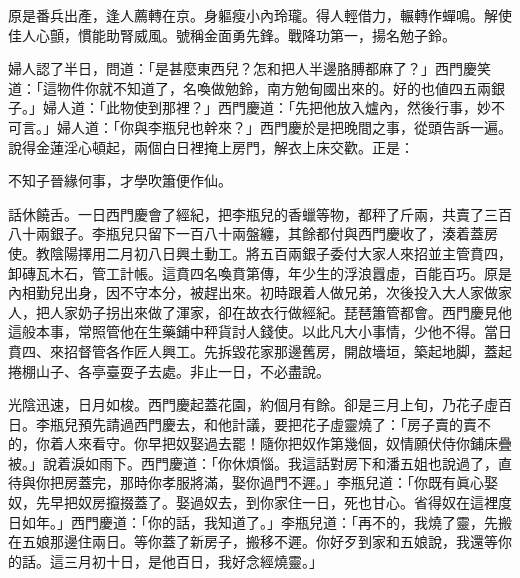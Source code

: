 \begin{myquote}
原是番兵出產，逢人薦轉在京。身軀瘦小內玲瓏。得人輕借力，輾轉作蟬鳴。解使佳人心顫，慣能助腎威風。號稱金面勇先鋒。戰降功第一，揚名勉子鈴。
\end{myquote}

婦人認了半日，問道：「是甚麼東西兒？怎和把人半邊胳膊都麻了？」{}西門慶笑道：「這物件你就不知道了，名喚做勉鈴，南方勉甸國出來的。好的也値四五兩銀子。」婦人道：「此物使到那裡？」西門慶道：「先把他放入爐內，然後行事，妙不可言。」婦人道：「你與李瓶兒也幹來？」{}西門慶於是把晚間之事，從頭告訴一遍。說得金蓮淫心頓起，兩個白日裡掩上房門，解衣上床交歡。正是：

\begin{myquote}
不知子晉緣何事，才學吹簫便作仙。
\end{myquote}

話休饒舌。一日西門慶會了經紀，把李瓶兒的香蠟等物，都秤了斤兩，共賣了三百八十兩銀子。李瓶兒只留下一百八十兩盤纏，其餘都付與西門慶收了，湊着蓋房使。教陰陽擇用二月初八日興土動工。將五百兩銀子委付大家人來招並主管賁四，卸磚瓦木石，管工計帳。這賁四名喚賁第傳，年少生的浮浪囂虛，百能百巧。原是內相勤兒出身，因不守本分，被趕出來。初時跟着人做兄弟，次後投入大人家做家人，把人家奶子拐出來做了渾家，{}卻在故衣行做經紀。琵琶簫管都會。西門慶見他這般本事，常照管他在生藥鋪中秤貨討人錢使。以此凡大小事情，少他不得。當日賁四、來招督管各作匠人興工。先拆毀花家那邊舊房，開啟墻垣，築起地脚，蓋起捲棚山子、各亭臺耍子去處。非止一日，不必盡說。

光陰迅速，日月如梭。西門慶起蓋花園，約個月有餘。卻是三月上旬，乃花子虛百日。李瓶兒預先請過西門慶去，和他計議，要把花子虛靈燒了：「房子賣的賣不的，你着人來看守。你早把奴娶過去罷！隨你把奴作第幾個，奴情願伏侍你鋪床疊被。」說着淚如雨下。{}西門慶道：「你休煩惱。我這話對房下和潘五姐也說過了，直待與你把房蓋完，那時你孝服將滿，娶你過門不遲。」李瓶兒道：「你既有眞心娶奴，先早把奴房攛掇蓋了。娶過奴去，到你家住一日，死也甘心。{}省得奴在這裡度日如年。」西門慶道：「你的話，我知道了。」李瓶兒道：「再不的，我燒了靈，先搬在五娘那邊住兩日。{}等你蓋了新房子，搬移不遲。你好歹到家和五娘說，我還等你的話。這三月初十日，是他百日，我好念經燒靈。」

